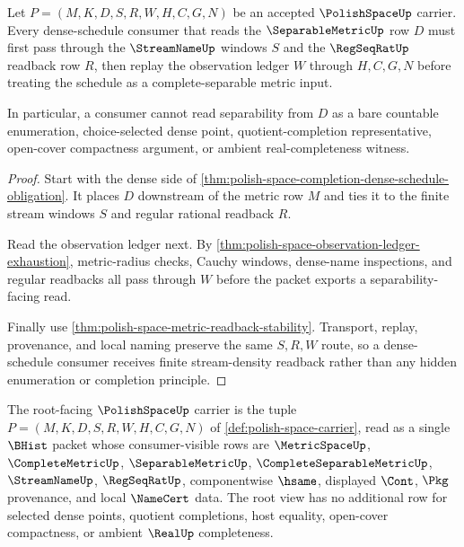\begin{theorem}
\label{thm:polish-space-stream-density-readback-row}
Let $P=(M,K,D,S,R,W,H,C,G,N)$ be an accepted $\PolishSpaceUp$ carrier. Every dense-schedule consumer that reads the $\SeparableMetricUp$ row $D$ must first pass through the $\StreamNameUp$ windows $S$ and the $\RegSeqRatUp$ readback row $R$, then replay the observation ledger $W$ through $H,C,G,N$ before treating the schedule as a complete-separable metric input.

In particular, a consumer cannot read separability from $D$ as a bare countable enumeration, choice-selected dense point, quotient-completion representative, open-cover compactness argument, or ambient real-completeness witness.
\end{theorem}
\begin{proof}
Start with the dense side of \autoref{thm:polish-space-completion-dense-schedule-obligation}. It places $D$ downstream of the metric row $M$ and ties it to the finite stream windows $S$ and regular rational readback $R$.

Read the observation ledger next. By \autoref{thm:polish-space-observation-ledger-exhaustion}, metric-radius checks, Cauchy windows, dense-name inspections, and regular readbacks all pass through $W$ before the packet exports a separability-facing read.

Finally use \autoref{thm:polish-space-metric-readback-stability}. Transport, replay, provenance, and local naming preserve the same $S,R,W$ route, so a dense-schedule consumer receives finite stream-density readback rather than any hidden enumeration or completion principle.
\end{proof}

\begin{definition}
\label{def:polishspace-carrier}
The root-facing $\PolishSpaceUp$ carrier is the tuple
$P=(M,K,D,S,R,W,H,C,G,N)$ of \autoref{def:polish-space-carrier}, read as a
single $\BHist$ packet whose consumer-visible rows are $\MetricSpaceUp$,
$\CompleteMetricUp$, $\SeparableMetricUp$, $\CompleteSeparableMetricUp$,
$\StreamNameUp$, $\RegSeqRatUp$, componentwise $\hsame$, displayed $\Cont$,
$\Pkg$ provenance, and local $\NameCert$ data. The root view has no additional
row for selected dense points, quotient completions, host equality,
open-cover compactness, or ambient $\RealUp$ completeness.
\end{definition}


